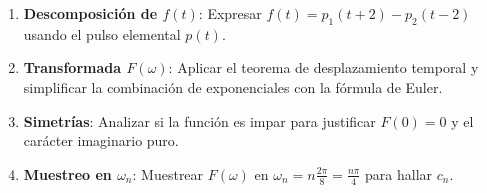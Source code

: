\begin{mecanizado}
\begin{enumerate}
    \item \textbf{Descomposición de $f(t)$}: Expresar $f(t) = p_1(t+2) - p_2(t-2)$ usando el pulso elemental $p(t)$.
    \item \textbf{Transformada $F(\omega)$}: Aplicar el teorema de desplazamiento temporal y simplificar la combinación de exponenciales con la fórmula de Euler.
    \item \textbf{Simetrías}: Analizar si la función es impar para justificar $F(0) = 0$ y el carácter imaginario puro.
    \item \textbf{Muestreo en $\omega_n$}: Muestrear $F(\omega)$ en $\omega_n = n \frac{2\pi}{8} = \frac{n\pi}{4}$ para hallar $c_n$.
\end{enumerate}
\end{mecanizado}

